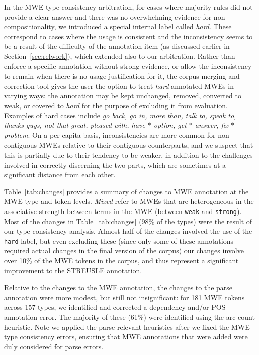 \documentclass[output=paper
,modfonts
,nonflat]{langsci/langscibook}
\newcommand{\lex}[1]{\textit{#1}\xspace}
\newcommand{\mwetype}[1]{\texttt{#1}\xspace}
\newcommand{\strongish}{\mwetype{strong}}
\newcommand{\weak}{\mwetype{weak}}
\newcommand{\hard}{\mwetype{hard}}
\newcommand{\gap}{$*$\xspace}
\newcommand{\tableref}[1]{Table~\ref{#1}\xspace}
\newcommand{\sectionref}[1]{Section~\ref{#1}\xspace}
\begin{document}
In the MWE type consistency arbitration, for cases where majority rules did not provide a clear answer and there was no overwhelming evidence for non-compositionality, we introduced a special internal label called \lex{hard}. These correspond to cases where the usage is consistent and the inconsistency seems to be a result of the difficulty of the annotation item (as discussed earlier in \sectionref{sec:relwork}), which extended also to our arbitration. Rather than enforce a specific annotation without strong evidence, or allow the inconsistency to remain when there is no usage justification for it, the corpus merging and correction tool gives the user the option to treat \lex{hard} annotated MWEs in varying ways: the annotation may be kept unchanged, removed, converted to weak, or covered to \lex{hard} for the purpose of excluding it from evaluation. Examples of hard cases include \lex{go back, go in, more than, talk to, speak to, thanks guys, not that great, pleased with, have \gap option, get \gap answer, fix \gap problem}. On a per capita basis, inconsistencies are more common for non-contiguous MWEs relative to their contiguous counterparts, and we suspect that this is partially due to their tendency to be weaker, in addition to the challenges involved in correctly discerning the two parts, which are sometimes at a significant distance from each other. 

\tableref{tab:changes} provides a summary of changes to MWE annotation at the MWE type and token levels.  \lex{Mixed} refer to MWEs that are heterogeneous in the associative strength between terms in the MWE (between \weak and \strongish). Most of the changes in \tableref{tab:changes} (98\% of the types) were the result of our type consistency analysis. Almost half of the changes involved the use of the \hard label, but even excluding these (since only some of these annotations required actual changes in the final version of the corpus) our changes involve over 10\% of the MWE tokens in the corpus, and thus represent a significant improvement to the STREUSLE annotation.  

Relative to the changes to the MWE annotation, the changes to the parse annotation were more modest, but still not insignificant: for 181 MWE tokens across 157 types, we identified and corrected a dependency and/or POS annotation error. The majority of these (61\%) were identified using the arc count heuristic. Note we applied the parse relevant heuristics after we fixed the MWE type consistency errors, ensuring that MWE annotations that were added were duly considered for parse errors.
\end{document}

